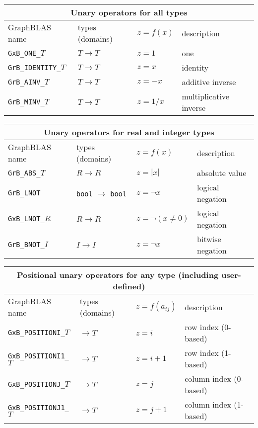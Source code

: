 \documentclass[12pt]{article}
\begin{document}
\vspace{0.2in}
{\footnotesize
\begin{tabular}{|llll|}
\hline
\multicolumn{4}{|c|}{Unary operators for all types} \\
\hline
GraphBLAS name          & types (domains)   & $z=f(x)$      & description \\
\hline
\verb'GxB_ONE_'$T$      & $T \rightarrow T$ & $z = 1$       & one \\
\verb'GrB_IDENTITY_'$T$ & $T \rightarrow T$ & $z = x$       & identity \\
\verb'GrB_AINV_'$T$     & $T \rightarrow T$ & $z = -x$      & additive inverse \\
\verb'GrB_MINV_'$T$     & $T \rightarrow T$ & $z = 1/x$     & multiplicative inverse \\
\hline
\end{tabular}

\vspace{0.2in}
\begin{tabular}{|llll|}
\hline
\multicolumn{4}{|c|}{Unary operators for real and integer types} \\
\hline
GraphBLAS name          & types (domains)   & $z=f(x)$      & description \\
\hline
\verb'GrB_ABS_'$T$      & $R \rightarrow R$ & $z = |x|$     & absolute value \\
\verb'GrB_LNOT'         & \verb'bool'
                          $\rightarrow$
                          \verb'bool'       & $z = \lnot x$ & logical negation \\
\verb'GxB_LNOT_'$R$     & $R \rightarrow R$ & $z = \lnot (x \ne 0)$ & logical negation \\
\verb'GrB_BNOT_'$I$     & $I \rightarrow I$ & $z = \lnot x$ & bitwise negation \\
\hline
\end{tabular}

\vspace{0.2in}
\begin{tabular}{|llll|}
\hline
\multicolumn{4}{|c|}{Positional unary operators for any type (including user-defined)} \\
\hline
GraphBLAS name            & types (domains)   & $z=f(a_{ij})$      & description \\
\hline
\verb'GxB_POSITIONI_'$T$  & $ \rightarrow T$  & $z = i$       & row index (0-based) \\
\verb'GxB_POSITIONI1_'$T$ & $ \rightarrow T$  & $z = i+1$     & row index (1-based) \\
\verb'GxB_POSITIONJ_'$T$  & $ \rightarrow T$  & $z = j$       & column index (0-based) \\
\verb'GxB_POSITIONJ1_'$T$ & $ \rightarrow T$  & $z = j+1$     & column index (1-based) \\
\hline
\end{tabular}
\vspace{0.2in}

}
\end{document}
